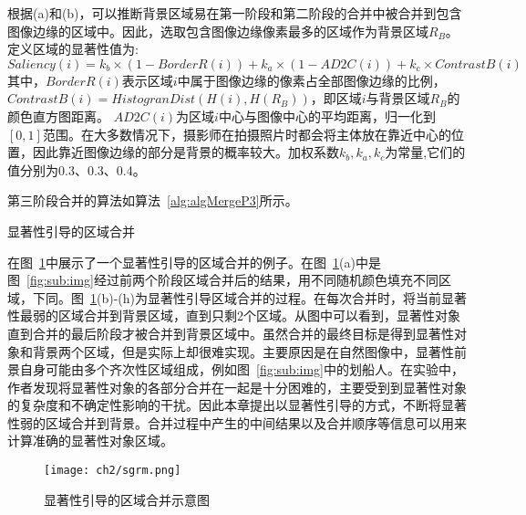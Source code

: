 根据(a)和(b)，可以推断背景区域易在第一阶段和第二阶段的合并中被合并到包含图像边缘的区域中。因此，选取包含图像边缘像素最多的区域作为背景区域$R_B$。定义区域的显著性值为:
\begin{equation}
   \label{equ:chap2:Saliency}
   Saliency(i)=k_b \times (1-BorderR(i))+ k_a \times (1-AD2C(i)) + k_c \times ContrastB(i)
\end{equation}
其中，$BorderR(i)$表示区域$i$中属于图像边缘的像素占全部图像边缘的比例，$ContrastB(i)=HistogranDist(H(i),H(R_B ))$，即区域$i$与背景区域$R_B$的颜色直方图距离。 $AD2C(i)$为区域$i$中心与图像中心的平均距离，归一化到$[0,1]$范围。在大多数情况下，摄影师在拍摄照片时都会将主体放在靠近中心的位置，因此靠近图像边缘的部分是背景的概率较大。加权系数$k_b,k_a,k_c$为常量,它们的值分别为0.3、0.3、0.4。\par
第三阶段合并的算法如算法~\ref{alg:algMergeP3}所示。
\renewcommand{\algorithmcfname}{算法}
\begin{algorithm}[htb]
\LinesNumbered
{}


\caption{显著性引导的区域合并}
\label{alg:algMergeP3}

\end{algorithm}
\par
在图~\ref{fig:sgrm}中展示了一个显著性引导的区域合并的例子。在图~\ref{fig:sgrm}(a)中是图~\ref{fig:sub:img}经过前两个阶段区域合并后的结果，用不同随机颜色填充不同区域，下同。图~\ref{fig:sgrm}(b)-(h)为显著性引导区域合并的过程。在每次合并时，将当前显著性最弱的区域合并到背景区域，直到只剩2个区域。从图中可以看到，显著性对象直到合并的最后阶段才被合并到背景区域中。虽然合并的最终目标是得到显著性对象和背景两个区域，但是实际上却很难实现。主要原因是在自然图像中，显著性前景自身可能由多个齐次性区域组成，例如图~\ref{fig:sub:img}中的划船人。在实验中，作者发现将显著性对象的各部分合并在一起是十分困难的，主要受到到显著性对象的复杂度和不确定性影响的干扰。因此本章提出以显著性引导的方式，不断将显著性弱的区域合并到背景。合并过程中产生的中间结果以及合并顺序等信息可以用来计算准确的显著性对象区域。

\begin{figure}[htb]
  \centering%
      {\texttt{[image: ch2/sgrm.png]}}\\

  \caption{显著性引导的区域合并示意图}
  \label{fig:sgrm}
\end{figure}

